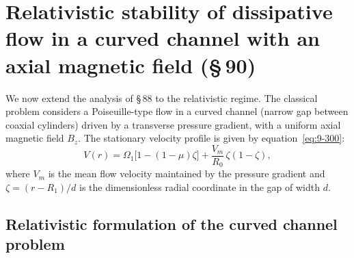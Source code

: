 %
%
%

\section{Relativistic stability of dissipative flow in a curved channel
with an axial magnetic field (\S\,90)}\label{sec:rel-9-90}

We now extend the analysis of \S\,88 to the relativistic regime.  The
classical problem considers a Poiseuille-type flow in a curved channel
(narrow gap between coaxial cylinders) driven by a transverse pressure
gradient, with a uniform axial magnetic field $B_z$.  The stationary
velocity profile is given by equation~\eqref{eq:9-300}:
\begin{equation}\label{eq:rel-9-V-profile}
  V(r) = \Omega_1\bigl[1 - (1 - \mu)\zeta\bigr]
  + \frac{V_m}{R_0}\,\zeta(1 - \zeta),
\end{equation}
where $V_m$ is the mean flow velocity maintained by the pressure gradient
and $\zeta = (r - R_1)/d$ is the dimensionless radial coordinate in the
gap of width $d$.

\subsection{Relativistic formulation of the curved channel problem}

